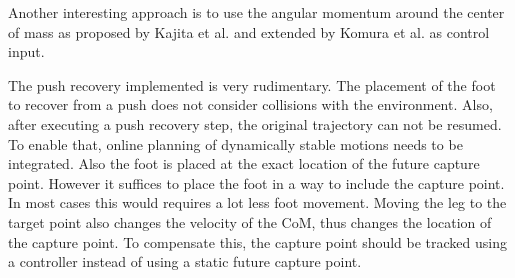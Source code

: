 \documentclass[english,ngerman]{KITreprt}
\begin{document}
Another interesting approach is to use the angular momentum around the
center of mass as proposed by Kajita et al. \cite{kajita2001balancing}
and extended by Komura et al. \cite{komura2005feedback} as control
input.

The push recovery implemented is very rudimentary. The placement of the
foot to recover from a push does not consider collisions with the
environment. Also, after executing a push recovery step, the original
trajectory can not be resumed. To enable that, online planning of
dynamically stable motions needs to be integrated. Also the foot is
placed at the exact location of the future capture point. However it
suffices to place the foot in a way to include the capture point. In
most cases this would requires a lot less foot movement. Moving the leg
to the target point also changes the velocity of the CoM, thus changes
the location of the capture point. To compensate this, the capture point
should be tracked using a controller instead of using a static future
capture point.




\end{document}
